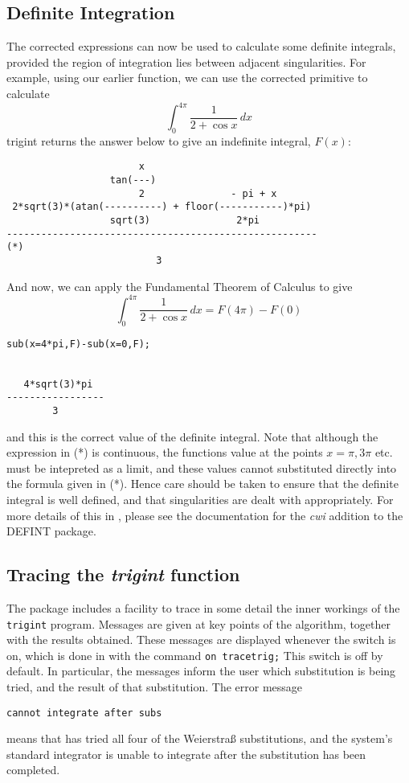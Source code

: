 \subsection{Definite Integration}
The corrected expressions can now be used to calculate some definite integrals, provided the region of integration lies between adjacent singularities. For example, using our earlier function, we can use the corrected primitive to calculate
     \begin{equation} \int_{0}^{4\pi} \frac{1}{2+\cos x}\,dx \end{equation}
trigint returns the answer below to give an indefinite integral, $F(x)$:
\begin{verbatim}
                       x
                  tan(---)
                       2               - pi + x
 2*sqrt(3)*(atan(----------) + floor(-----------)*pi)
                  sqrt(3)               2*pi
------------------------------------------------------                   (*)
                          3
\end{verbatim}
And now, we can apply the Fundamental Theorem of Calculus to give
 \begin{equation} \int_{0}^{4\pi} \frac{1}{2+\cos x}\,dx = F(4\pi)-F(0) \end{equation}
\begin{verbatim}
sub(x=4*pi,F)-sub(x=0,F);


   4*sqrt(3)*pi
-----------------
        3
\end{verbatim}
and this is the correct value of the definite integral.
Note that although the expression in (*) is continuous, the functions value at the points $x=\pi,3\pi$ etc. must be intepreted as a limit, and these values cannot substituted directly into the formula given in (*). Hence care should be taken to ensure that the definite integral is well defined, and that singularities are dealt with appropriately. For more details of this in \REDUCE, please see the documentation for the \emph{cwi} addition to the \textsc{DEFINT} package.

\subsection{Tracing the \emph{trigint} function}

The package includes a facility to trace in some detail the inner workings of the \texttt{trigint} program. Messages are given at key points of the algorithm, together with the results obtained. These messages are displayed whenever the switch  is on, which is done in \REDUCE with the
\hypertarget{switch:TRACETRIG}{}
command \texttt{on tracetrig;}
This switch is off by default. In particular, the messages inform the user which substitution is being tried, and the result of that substitution. The error message
\begin{verbatim}
cannot integrate after subs
\end{verbatim}
means that \REDUCE has tried all four of the Weierstra\ss{} substitutions, and the system's standard integrator is unable to integrate after the substitution has been completed.

